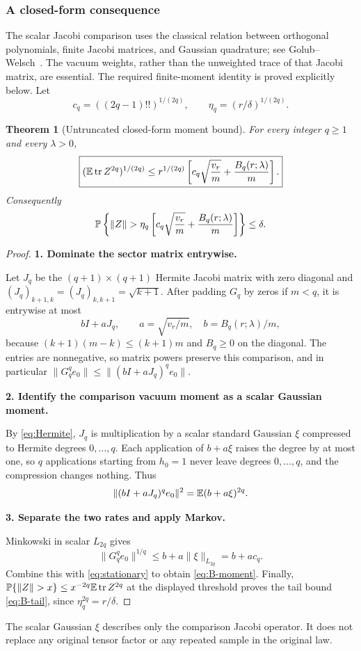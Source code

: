 \documentclass[11pt]{article}
\numberwithin{equation}{section}
\newtheorem{theorem}{Theorem}[section]
\theoremstyle{definition}\newtheorem{definition}[theorem]{Definition}
\theoremstyle{remark}\newtheorem{remark}[theorem]{Remark}
\newcommand{\tr}{\operatorname{tr}}\newcommand{\Ent}{\operatorname{Ent}}
\newcommand{\norm}[1]{\lVert#1\rVert}\newcommand{\ip}[2]{\langle#1,#2\rangle}
\newcommand{\step}[1]{\par\addvspace{.65\baselineskip}\Needspace{4\baselineskip}\noindent\textbf{#1}\par\nobreak\smallskip}
\begin{document}
\subsubsection{A closed-form consequence}
The scalar Jacobi comparison uses the classical relation between orthogonal
polynomials, finite Jacobi matrices, and Gaussian quadrature; see
Golub--Welsch~\cite{GolubWelsch}. The vacuum weights, rather than the unweighted
trace of that Jacobi matrix, are essential. The required finite-moment identity
is proved explicitly below.
Let
\begin{equation}\label{eq:cq-eta}
 c_q=((2q-1)!!)^{1/(2q)},\qquad
 \eta_q=(r/\delta)^{1/(2q)}.
\end{equation}
\begin{theorem}[Untruncated closed-form moment bound]\label{thm:B-closed}
For every integer $q\ge1$ and every $\lambda>0$,
\begin{equation}\label{eq:B-moment}
 \boxed{(\E\tr Z^{2q})^{1/(2q)}
 \le r^{1/(2q)}\left[c_q\sqrt{\frac{v_r}{m}}+\frac{B_q(r;\lambda)}m\right].}
\end{equation}
Consequently
\begin{equation}\label{eq:B-tail}
 \Prob\left\{\norm Z>
 \eta_q\left[c_q\sqrt{\frac{v_r}{m}}+\frac{B_q(r;\lambda)}m\right]\right\}
 \le\delta.
\end{equation}
\end{theorem}
\begin{proof}
\step{1. Dominate the sector matrix entrywise.}
Let $J_q$ be the $(q+1)\times(q+1)$ Hermite Jacobi matrix with zero diagonal and
$(J_q)_{k+1,k}=(J_q)_{k,k+1}=\sqrt{k+1}$.
After padding $G_q$ by zeros if $m<q$, it is entrywise at most
\[
 bI+aJ_q,\qquad a=\sqrt{v_r/m},\quad b=B_q(r;\lambda)/m,
\]
because $(k+1)(m-k)\le(k+1)m$ and $B_q\ge0$ on the diagonal.
The entries are nonnegative, so matrix powers preserve this comparison, and in
particular $\norm{G_q^qe_0}\le\norm{(bI+aJ_q)^qe_0}$.

\step{2. Identify the comparison vacuum moment as a scalar Gaussian moment.}
By \eqref{eq:Hermite}, $J_q$ is multiplication by a scalar standard Gaussian
$\xi$ compressed to Hermite degrees $0,\ldots,q$. Each application of
$b+a\xi$ raises the degree by at most one, so $q$ applications starting from
$h_0=1$ never leave degrees $0,\ldots,q$, and the compression changes nothing.
Thus
\[
 \norm{(bI+aJ_q)^qe_0}^2=\E(b+a\xi)^{2q}.
\]

\step{3. Separate the two rates and apply Markov.}
Minkowski in scalar $L_{2q}$ gives
\[
 \norm{G_q^qe_0}^{1/q}\le b+a\norm\xi_{L_{2q}}=b+ac_q.
\]
Combine this with \eqref{eq:stationary} to obtain \eqref{eq:B-moment}. Finally,
$\Prob\{\norm Z>x\}\le x^{-2q}\E\tr Z^{2q}$ at the displayed threshold proves
the tail bound \eqref{eq:B-tail}, since $\eta_q^{2q}=r/\delta$.
\end{proof}
The scalar Gaussian $\xi$ describes only the comparison Jacobi operator. It does
not replace any original tensor factor or any repeated sample in the original law.
\end{document}

